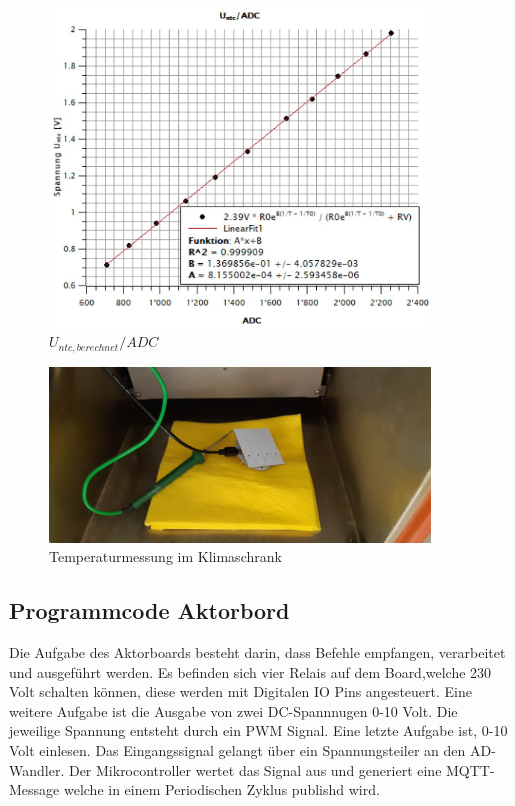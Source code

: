 \begin{figure}[H]
	\centering
	\includegraphics[width=0.9\textwidth]{graphics/Untc_ADC.jpg}
	\caption{$U_{ntc,berechnet}/ADC$}
	\label{pic: Untc_ADC}
\end{figure}

\begin{figure}[H]
	\centering
	\includegraphics[width=0.90\textwidth]{graphics/Klimaschrank.jpg}
	\caption{Temperaturmessung im Klimaschrank}
	\label{pic: Klimaschrank}
\end{figure}

\newpage
\subsection{Programmcode Aktorbord}
Die Aufgabe des Aktorboards besteht darin, dass Befehle empfangen, verarbeitet und ausgeführt werden. Es befinden sich vier Relais auf dem Board,welche 230 Volt schalten können, diese werden mit Digitalen IO Pins angesteuert. Eine weitere Aufgabe ist die Ausgabe von zwei DC-Spannnugen 0-10 Volt. Die jeweilige Spannung entsteht durch ein PWM Signal. Eine letzte Aufgabe ist, 0-10 Volt einlesen. Das Eingangssignal gelangt über ein Spannungsteiler an den AD-Wandler. Der Mikrocontroller wertet das Signal aus und generiert eine MQTT-Message welche in einem Periodischen Zyklus publishd wird.    


